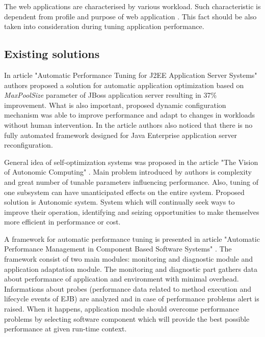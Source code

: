 \documentclass[12pt,a4paper]{article}
\begin{document}
The web applications are characterised by various workload. Such characteristic is dependent from profile and purpose of web application \cite{invariantsworkloads}. This fact should be also taken into consideration during tuning application performance. 

\subsection{Existing solutions} \label{ExistingSolutions}
In article "Automatic Performance Tuning for J2EE Application Server Systems" \cite{autotuning} authors proposed a solution for automatic application optimization based on \textit{MaxPoolSize} parameter of JBoss application server resulting in 37\% improvement. What is also important, proposed dynamic configuration  mechanism  was able to improve  performance  and  adapt  to  changes  in  workloads without human intervention. In the article authors also noticed that there is no fully automated framework designed for Java Enterprise application server reconfiguration.

General idea of self-optimization systems was proposed in the article "The Vision of Autonomic Computing" \cite{autoarch}. Main problem introduced by authors is complexity and great number of tunable parameters influencing performance. Also, tuning of one subsystem can have unanticipated effects on the entire system. Proposed solution is Autonomic system. System which will continually seek ways to improve their operation, identifying and seizing opportunities to make themselves more efficient in performance or cost. 

A framework for automatic performance tuning is presented in article "Automatic Performance Management in Component Based Software Systems" \cite{autoframework}. The framework consist of two main modules: monitoring and diagnostic module and application adaptation module. The monitoring and diagnostic part gathers data about performance of application and environment with minimal overhead. Informations about probes (performance data related to method execution and lifecycle
events of EJB) are analyzed and in case of performance problems alert is raised. When it happens, application module should overcome performance problems by selecting software component which will provide the best possible performance at given run-time context. 
\end{document}
